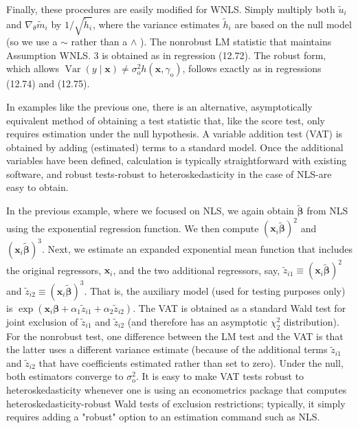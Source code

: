 \documentclass[10pt]{article}
\begin{document}
Finally, these procedures are easily modified for WNLS. Simply multiply both $\tilde{u}_{i}$ and $\nabla_{\theta} \tilde{m}_{i}$ by $1 / \sqrt{\tilde{h}_{i}}$, where the variance estimates $\tilde{h}_{i}$ are based on the null model (so we use a $\sim$ rather than a $\wedge$ ). The nonrobust LM statistic that maintains Assumption WNLS. 3 is obtained as in regression (12.72). The robust form, which allows $\operatorname{Var}(y \mid \mathbf{x}) \neq \sigma_{\mathrm{o}}^{2} h\left(\mathbf{x}, \gamma_{\mathrm{o}}\right)$, follows exactly as in regressions (12.74) and (12.75).

In examples like the previous one, there is an alternative, asymptotically equivalent method of obtaining a test statistic that, like the score test, only requires estimation under the null hypothesis. A variable addition test (VAT) is obtained by adding (estimated) terms to a standard model. Once the additional variables have been defined, calculation is typically straightforward with existing software, and robust tests-robust to heteroskedasticity in the case of NLS-are easy to obtain.

In the previous example, where we focused on NLS, we again obtain $\tilde{\boldsymbol{\beta}}$ from NLS using the exponential regression function. We then compute $\left(\mathbf{x}_{i} \tilde{\boldsymbol{\beta}}\right)^{2}$ and $\left(\mathbf{x}_{i} \tilde{\boldsymbol{\beta}}\right)^{3}$. Next, we estimate an expanded exponential mean function that includes the original regressors, $\mathbf{x}_{i}$, and the two additional regressors, say, $\tilde{z}_{i 1} \equiv\left(\mathbf{x}_{i} \tilde{\boldsymbol{\beta}}\right)^{2}$ and $\tilde{z}_{i 2} \equiv\left(\mathbf{x}_{i} \tilde{\boldsymbol{\beta}}\right)^{3}$. That is, the auxiliary model (used for testing purposes only) is $\exp \left(\mathbf{x}_{i} \boldsymbol{\beta}+\alpha_{1} \tilde{z}_{i 1}+\alpha_{2} \tilde{z}_{i 2}\right)$. The VAT is obtained as a standard Wald test for joint exclusion of $\tilde{z}_{i 1}$ and $\tilde{z}_{i 2}$ (and therefore has an asymptotic $\chi_{2}^{2}$ distribution). For the nonrobust test, one difference between the LM test and the VAT is that the latter uses a different variance estimate (because of the additional terms $\tilde{z}_{i 1}$ and $\tilde{z}_{i 2}$ that have coefficients estimated rather than set to zero). Under the null, both estimators converge to $\sigma_{\mathrm{o}}^{2}$. It is easy to make VAT tests robust to heteroskedasticity whenever one is using an econometrics package that computes heteroskedasticity-robust Wald tests of exclusion restrictions; typically, it simply requires adding a "robust" option to an estimation command such as NLS.
\end{document}

